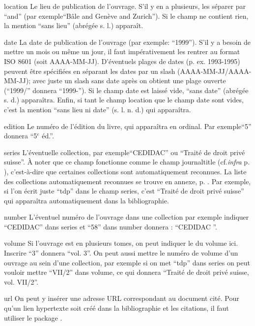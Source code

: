 \documentclass[a4paper]{ltxdockit}[2011/03/25]
\newcommand{\infra}{\emph{infra}\xspace}
\newcommand{\cf}{cf.\xspace}
\newcommand{\GM}{\enquote}
\newcommand{\pex}{\textnormal{par exemple}\xspace}
\newcommand{\Pex}{\textnormal{Par exemple}\xspace}
\begin{document}
\begin{marglist}
\item[location]\label{location}Le lieu de publication de l'ouvrage. S'il y en a plusieurs, les séparer par \GM{and} (\pex \GM{Bâle and Genève and Zurich}). Si le champ ne contient rien, la mention \GM{sans lieu} (abrégée s. l.) apparaît. 

\item[date]\label{date}La date de publication de l'ouvrage (\pex: \GM{1999}). S'il y a besoin de mettre un mois ou même un jour, il faut impérativement les rentrer au format ISO 8601 (soit AAAA-MM-JJ). D'éventuels plages de dates (p. ex. 1993-1995) peuvent être spécifiées en séparant les dates par un slash (AAAA-MM-JJ/AAAA-MM-JJ); avec juste un slash sans date après on obtient une plage ouverte (\GM{1999/} donnera \GM{1999-}). Si le champ date est laissé vide, \GM{sans date} (abrégée s. d.) apparaîtra. Enfin, si tant le champ location que le champ date sont vides, c'est la mention \GM{sans lieu ni date} (s. l. n. d.) qui apparaîtra.

\item[edition]\label{edition}Le numéro de l'édition du livre, qui apparaîtra en ordinal. \Pex \GM{5} donnera \GM{5$^e$ éd.}. 

\item[series]\label{series}L'éventuelle collection, \pex \GM{CEDIDAC} ou \GM{Traité de droit privé suisse}. À noter que ce champ fonctionne comme le champ journaltitle (\cf \infra p. \pageref{journaltitle}), c'est-à-dire que certaines collections sont automatiquement reconnues. La liste des collections automatiquement reconnues se trouve en annexe, p. \pageref{listecollections}. \Pex, si l'on écrit juste \GM{tdp} dans le champ series, c'est \GM{Traité de droit privé suisse} qui apparaîtra automatiquement dans la bibliographie.

\item[number]\label{number}L'éventuel numéro de l'ouvrage dans une collection \pex indiquer \GM{CEDIDAC} dans series et \GM{58} dans number donnera : \GM{CEDIDAC }.

\item[volume]\label{volume}Si l'ouvrage est en plusieurs tomes, on peut indiquer le \no du volume ici. Inscrire \GM{3} donnera \GM{vol. 3}. On peut aussi mettre le numéro de volume d'un ouvrage au sein d'une collection, \pex si on met \GM{tdp}  dans series on peut vouloir mettre \GM{VII/2} dans volume, ce qui donnera \GM{Traité de droit privé suisse, vol. VII/2}.

\item[url]\label{url}On peut y insérer une adresse URL correspondant au document cité. Pour qu'un lien hypertexte soit créé dans la bibliographie et les citations, il faut utiliser le package .


\end{marglist}
\end{document}
